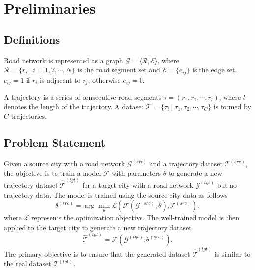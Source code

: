 \section{Preliminaries}
\label{sec:preliminaries}

\subsection{Definitions}
\begin{definition} Road network is represented as a graph $\mathcal{G = \langle R,E\rangle}$, where $\mathcal{R} = \{r_i\mid i = 1, 2,\cdots,N\}$ is the road segment set and $\mathcal E=\{e_{ij}\}$ is the edge set. $e_{ij} = 1$ if $r_i$ is adjacent to $r_j$, otherwise $e_{ij} = 0$. 
\end{definition}


\begin{definition}[Trajectory] A trajectory is a series of consecutive road segments $\tau = (r_1,r_2,\cdots,r_{l})$, where $l$ denotes the length of the trajectory. A dataset $\mathcal{T} = \{\tau_i \mid \tau_1, \tau_2, \cdots, \tau_C\}$ is formed by $C$ trajectories. \end{definition}

\subsection{Problem Statement}

Given a source city with a road network $\mathcal{G}^{(src)}$ and a trajectory dataset $\mathcal{T}^{(src)}$, the objective is to train a model $\mathcal{F}$ with parameters $\theta$ to generate a new trajectory dataset $\hat{\mathcal{T}}^{(tgt)}$ for a target city with a road network $\mathcal{G}^{(tgt)}$ but no trajectory data. The model is trained using the source city data as follows
\begin{equation}
\theta^{(src)} = \arg \min_{\theta} \mathcal{L} \left( \mathcal{F} \left( \mathcal{G}^{(src)}; \theta \right), \mathcal{T}^{(src)} \right),
\end{equation}
where $\mathcal{L}$ represents the optimization objective. The well-trained model is then applied to the target city to generate a new trajectory dataset
\begin{equation}
\hat{\mathcal{T}}^{(tgt)} = \mathcal{F} \left(
\mathcal{G}^{(tgt)}; \theta^{(src)}
\right).
\end{equation}
The primary objective is to ensure that the generated dataset $\hat{\mathcal{T}}^{(tgt)}$ is similar to the real dataset $\mathcal{T}^{(tgt)}$.